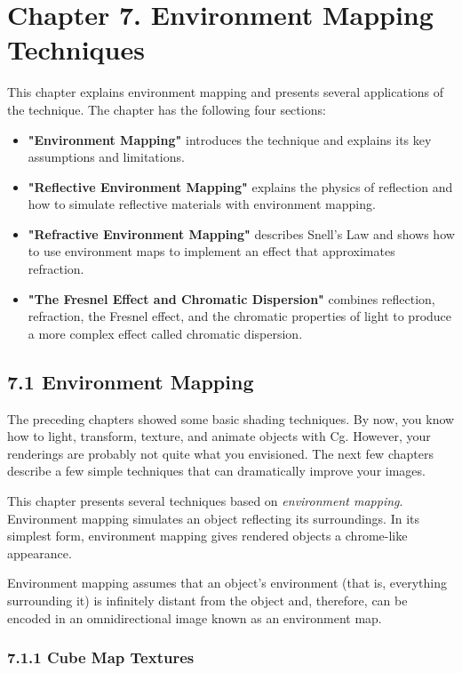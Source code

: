 \documentclass[../main.tex]{subfiles}
\begin{document}
\chapter{Chapter 7. Environment Mapping Techniques}

This chapter explains environment mapping and presents several applications of the technique. The chapter has the following four sections:

\begin{itemize}
\item \textbf{"Environment Mapping"} introduces the technique and explains its key assumptions and limitations.
\item \textbf{"Reflective Environment Mapping"} explains the physics of reflection and how to simulate reflective materials with environment mapping.
\item \textbf{"Refractive Environment Mapping"} describes Snell's Law and shows how to use environment maps to implement an effect that approximates refraction.
\item \textbf{"The Fresnel Effect and Chromatic Dispersion"} combines reflection, refraction, the Fresnel effect, and the chromatic properties of light to produce a more complex effect called chromatic dispersion.
\end{itemize}

\section{7.1 Environment Mapping}

The preceding chapters showed some basic shading techniques. By now, you know how to light, transform, texture, and animate objects with Cg. However, your renderings are probably not quite what you envisioned. The next few chapters describe a few simple techniques that can dramatically improve your images.

This chapter presents several techniques based on \textit{environment mapping}. Environment mapping simulates an object reflecting its surroundings. In its simplest form, environment mapping gives rendered objects a chrome-like appearance.

Environment mapping assumes that an object's environment (that is, everything surrounding it) is infinitely distant from the object and, therefore, can be encoded in an omnidirectional image known as an environment map.

\subsection{7.1.1 Cube Map Textures}
\end{document}
